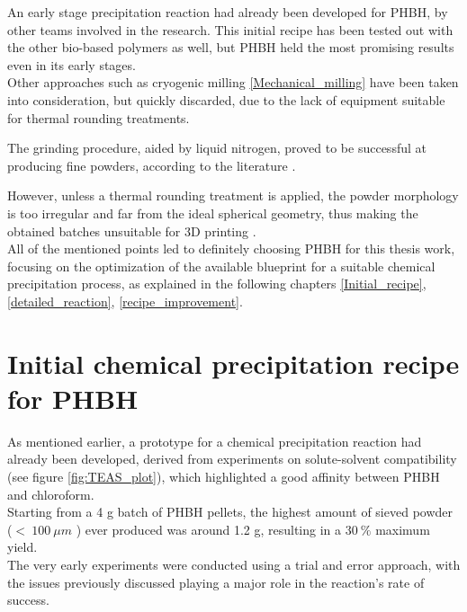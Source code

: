 \documentclass{article}
\begin{document}
    An early stage precipitation reaction had already been developed for PHBH, by other teams involved in the research. 
    This initial recipe has been tested out with the other bio-based polymers as well, but PHBH held the most promising 
    results even in its early stages. \\ 

    Other approaches such as cryogenic milling \ref{Mechanical_milling} have been taken into consideration, but quickly 
    discarded, due to the lack of equipment suitable for thermal rounding treatments. 

    The grinding procedure, aided by liquid nitrogen, proved to be successful at producing fine powders, according to the literature \autocites{Dechet_Schmidt_thermal_rounding}. 

    However, unless a thermal rounding treatment is applied, the powder 
    morphology is too irregular and far from the ideal spherical geometry, thus making the 
    obtained batches unsuitable for 3D printing \autocites{Dechet_Schmidt_thermal_rounding}. \\  

    All of the mentioned points led to definitely choosing PHBH for this thesis work, focusing on the optimization of 
    the available blueprint for a suitable chemical 
    precipitation process, as explained in the following chapters \ref{Initial_recipe}, \ref{detailed_reaction}, \ref{recipe_improvement}. 

    \clearpage
    \section{Initial chemical precipitation recipe for PHBH\label{Initial_recipe}}
    
    As mentioned earlier, a prototype for a chemical precipitation reaction had already been developed, 
    derived from experiments on solute-solvent compatibility (see figure \ref{fig:TEAS_plot}), 
    which highlighted a good affinity between PHBH and chloroform. \\ 

    Starting from a 4 g batch of PHBH pellets, the highest amount of sieved powder ($ < \ 100 \ \mu m$ )
    ever produced was around 1.2 g, resulting in a $30 \ \% $ maximum yield. \\ 

    The very early experiments were conducted using a trial and error approach, with the issues previously discussed 
    playing a major role in the reaction's rate of success. 
    
\end{document}
